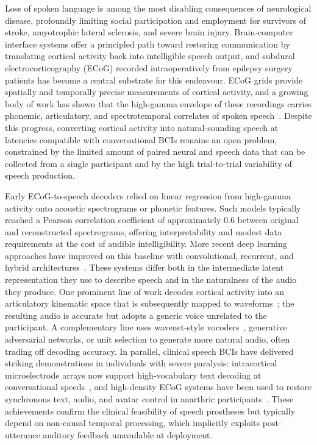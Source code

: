 \documentclass[11pt]{article}
\begin{document}
Loss of spoken language is among the most disabling consequences of
neurological disease, profoundly limiting social participation and
employment for survivors of stroke, amyotrophic lateral sclerosis, and
severe brain injury. Brain-computer interface systems offer a principled
path toward restoring communication by translating cortical activity back
into intelligible speech output, and subdural electrocorticography (ECoG)
recorded intraoperatively from epilepsy surgery patients has become a
central substrate for this endeavour. ECoG grids provide spatially and
temporally precise measurements of cortical activity, and a growing body
of work has shown that the high-gamma envelope of these recordings carries
phonemic, articulatory, and spectrotemporal correlates of spoken
speech~\cite{pasley2012reconstructing,bouchard2014control,mugler2014direct,herff2015brain,flinker2015redefining,wang2021dynamics}.
Despite this progress, converting cortical activity into natural-sounding
speech at latencies compatible with conversational BCIs remains an open
problem, constrained by the limited amount of paired neural and speech
data that can be collected from a single participant and by the high
trial-to-trial variability of speech production.

Early ECoG-to-speech decoders relied on linear regression from high-gamma
activity onto acoustic spectrograms or phonetic features. Such models
typically reached a Pearson correlation coefficient of approximately $0.6$
between original and reconstructed spectrograms, offering interpretability
and modest data requirements at the cost of audible intelligibility. More
recent deep learning approaches have improved on this baseline with
convolutional, recurrent, and hybrid
architectures~\cite{akbari2019towards,anumanchipalli2019speech,makin2020machine}.
These systems differ both in the intermediate latent representation they
use to describe speech and in the naturalness of the audio they produce.
One prominent line of work decodes cortical activity into an articulatory
kinematic space that is subsequently mapped to
waveforms~\cite{anumanchipalli2019speech}; the resulting audio is accurate
but adopts a generic voice unrelated to the participant. A complementary
line uses wavenet-style vocoders~\cite{akbari2019towards}, generative
adversarial networks, or unit selection to generate more natural audio,
often trading off decoding accuracy. In parallel, clinical speech BCIs
have delivered striking demonstrations in individuals with severe paralysis:
intracortical microelectrode arrays now support high-vocabulary text
decoding at conversational
speeds~\cite{willett2023highperformance}, and high-density ECoG systems
have been used to restore synchronous text, audio, and avatar control in
anarthric participants~\cite{moses2021neuroprosthesis,metzger2023highperformance,silva2024bilingual}.
These achievements confirm the clinical feasibility of speech prostheses
but typically depend on non-causal temporal processing, which implicitly
exploits post-utterance auditory feedback unavailable at deployment.
\end{document}
